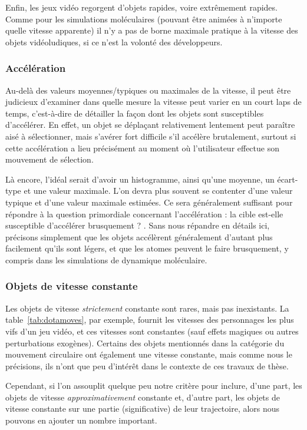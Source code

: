 	Enfin, les jeux vidéo regorgent d'objets rapides, voire extrêmement rapides. Comme pour les simulations moléculaires (pouvant être animées à n'importe quelle vitesse apparente) il n'y a pas de borne maximale pratique à la vitesse des objets vidéoludiques, si ce n'est la volonté des développeurs.
	
	\subsubsection{Accélération}
	Au-delà des valeurs moyennes/typiques ou maximales de la vitesse, il peut être judicieux d'examiner dans quelle mesure la vitesse peut varier en un court laps de temps, c'est-à-dire de détailler la façon dont les objets sont susceptibles d'accélérer. En effet, un objet se déplaçant relativement lentement peut paraître aisé à sélectionner, mais s'avérer fort difficile s'il accélère brutalement, surtout si cette accélération a lieu précisément au moment où l'utilisateur effectue son mouvement de sélection.
	
	Là encore, l'idéal serait d'avoir un histogramme, ainsi qu'une moyenne, un écart-type et une valeur maximale. L'on devra plus souvent se contenter d'une valeur typique et d'une valeur maximale estimées. Ce sera généralement suffisant pour répondre à la question primordiale concernant l'accélération : \og la cible est-elle susceptible d'accélérer brusquement ? \fg{}. Sans nous répandre en détails ici, précisons simplement que les objets accélèrent généralement d'autant plus facilement qu'ils sont légers, et que les atomes peuvent le faire brusquement, y compris dans les simulations de dynamique moléculaire.

	
	\subsubsection{Objets de vitesse constante}
	Les objets de vitesse \emph{strictement} constante sont rares, mais pas inexistants. La table~\ref{tab:dotamoves}, par exemple, fournit les vitesses des personnages les plus vifs d'un jeu vidéo, et ces vitesses sont constantes (sauf effets magiques ou autres perturbations exogènes). Certains des objets mentionnés dans la catégorie du mouvement circulaire ont également une vitesse constante, mais comme nous le précisions, ils n'ont que peu d'intérêt dans le contexte de ces travaux de thèse.
	
	Cependant, si l'on assouplit quelque peu notre critère pour inclure, d'une part, les objets de vitesse \emph{approximativement} constante et, d'autre part, les objets de vitesse constante sur une partie (significative) de leur trajectoire, alors nous pouvons en ajouter un nombre important.
	
